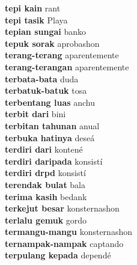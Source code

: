\textbf{ tepi kain  } rant \\
\textbf{ tepi tasik  } Playa \\
\textbf{ tepian sungai  } banko \\
\textbf{ tepuk sorak  } aprobashon \\
\textbf{ terang-terang  } aparentemente \\
\textbf{ terang-terangan  } aparentemente \\
\textbf{ terbata-bata  } duda \\
\textbf{ terbatuk-batuk  } tosa \\
\textbf{ terbentang luas  } anchu \\
\textbf{ terbit dari  } bini \\
\textbf{ terbitan tahunan  } anual \\
\textbf{ terbuka hatinya  } deseá \\
\textbf{ terdiri dari  } kontené \\
\textbf{ terdiri daripada  } konsistí \\
\textbf{ terdiri drpd  } konsistí \\
\textbf{ terendak bulat  } bala \\
\textbf{ terima kasih  } bedank \\
\textbf{ terkejut besar  } konsternashon \\
\textbf{ terlalu gemuk  } gordo \\
\textbf{ termangu-mangu  } konsternashon \\
\textbf{ ternampak-nampak  } captando \\
\textbf{ terpulang kepada  } dependé \\
